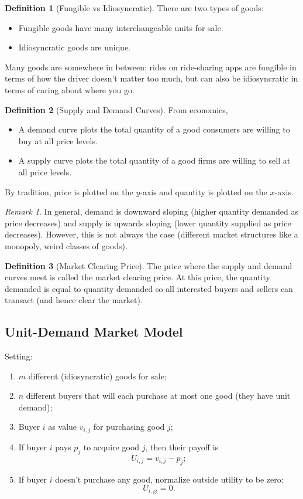 \documentclass[dvipsnames]{article}
\theoremstyle{definition}
\newtheorem{definition}{Definition}[section]
\theoremstyle{remark}
\newtheorem*{remark}{Remark}
\begin{document}
\begin{definition}[Fungible vs Idiosyncratic]
	There are two types of goods:
	\begin{itemize}
		\item Fungible goods have many interchangeable units for sale.
		\item Idiosyncratic goods are unique.
	\end{itemize}
	Many goods are somewhere in between: rides on ride-sharing apps are fungible in terms of how the driver doesn't matter too much, but can also be idiosyncratic in terms of caring about where you go.
\end{definition}

\begin{definition}[Supply and Demand Curves]
	From economics,
	\begin{itemize}
		\item A demand curve plots the total quantity of a good consumers are willing to buy at all price levels.
		\item A supply curve plots the total quantity of a good firms are willing to sell at all price levels.
	\end{itemize}
	By tradition, price is plotted on the $y$-axis and quantity is plotted on the $x$-axis.
\end{definition}

\begin{remark}
	In general, demand is downward sloping (higher quantity demanded as price decreases) and supply is upwards sloping (lower quantity supplied as price decreases). However, this is not always the case (different market structures like a monopoly, weird classes of goods).
\end{remark}

\begin{definition}[Market Clearing Price]
	The price where the supply and demand curves meet is called the market clearing price. At this price, the quantity demanded is equal to quantity demanded so all interested buyers and sellers can transact (and hence clear the market). 
\end{definition}

\subsection{Unit-Demand Market Model}

Setting:
\begin{enumerate}
	\item $m$ different (idiosyncratic) goods for sale;
	\item $n$ different buyers that will each purchase at most one good (they have unit demand);
	\item Buyer $i$ as value $v_{i,j}$ for purchasing good $j$;
	\item If buyer $i$ pays $p_j$ to acquire good $j$, then their payoff is
	$$U_{i,j} = v_{i,j} - p_j;$$
	\item If buyer $i$ doesn't purchase any good, normalize outside utility to be zero:
	$$U_{i, \varnothing} = 0.$$
\end{enumerate}
\end{document}
